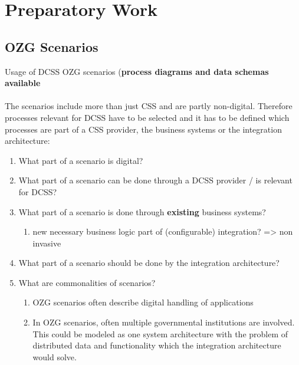 \documentclass[
     12pt,         %
     a4paper,      %
     BCOR=10mm,version=first,     %
     DIV=14,version=first,        %
     ]{scrreprt}
\begin{document}
\chapter{Preparatory Work}

\section{OZG Scenarios}

Usage of DCSS OZG scenarios (\textbf{process diagrams and data schemas available}
\\\\
The scenarios include more than just CSS and are partly non-digital. Therefore processes relevant for DCSS have to be selected
and it has to be defined which processes are part of a CSS provider, the business systems or the integration architecture:

\begin{enumerate}
     \item What part of a scenario is digital?
     \item What part of a scenario can be done through a DCSS provider / is relevant for DCSS?
     \item What part of a scenario is done through \textbf{existing} business systems?
           \begin{enumerate}
                \item new necessary business logic part of (configurable) integration? => non invasive
           \end{enumerate}
     \item What part of a scenario should be done by the integration architecture?
     \item What are commonalities of scenarios?
           \begin{enumerate}
                \item OZG scenarios often describe digital handling of applications
                \item In OZG scenarios, often multiple governmental institutions are involved. This could be modeled as one system architecture with the problem of distributed
                      data and functionality which the integration architecture would solve.
           \end{enumerate}
\end{enumerate}
\end{document}
